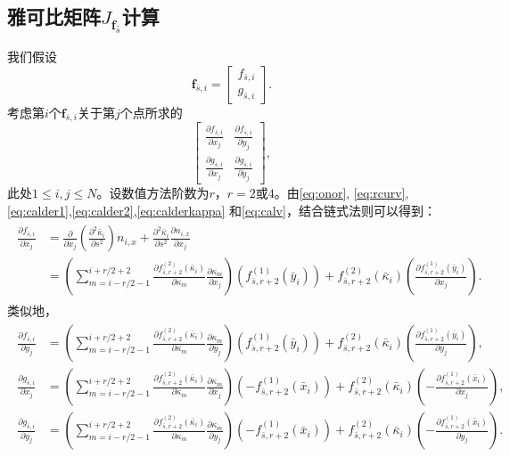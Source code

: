 \documentclass[a4paper,twoside]{ctexart}
\newcommand{\pdfrac}[2]{\frac{\partial #1}{\partial #2}}
\begin{document}
\subsection{雅可比矩阵$J_{\boldsymbol f_{\bar{s}}}$计算}
\label{calJacobi}
我们假设
\begin{equation}
  \boldsymbol f_{\bar{s},i} = \begin{bmatrix}
    f_{\bar{s},i}\\
    g_{\bar{s},i}

  \end{bmatrix}.
\end{equation}
考虑第$i$个$\boldsymbol f_{\bar{s},i}$关于第$j$个点所求的
\begin{equation}
  \label{eq:Jacobiij}
  \begin{bmatrix}
  \pdfrac{f_{\bar{s},i}}{x_j}& \pdfrac{f_{\bar{s},i}}{y_j} \\
  \pdfrac{g_{\bar{s},i}}{x_j}& \pdfrac{g_{\bar{s},i}}{y_j}
\end{bmatrix},
\end{equation}
此处$1 \le i,j \le N$。设数值方法阶数为$r$，$r = 2$或$4$。由\eqref{eq:onor},
\eqref{eq:rcurv},\eqref{eq:calder1},\eqref{eq:calder2},\eqref{eq:calderkappa}
和\eqref{eq:calv}，结合链式法则可以得到：
\begin{eqnarray}
  \label{eq:showcalJacobi}
  \begin{aligned}
    \pdfrac{f_{\bar{s},i}}{x_j} &= \frac{\partial }{\partial
      x_j}(\frac{\partial^2\bar{\kappa}_i}{\partial s^2})n_{i,x}+
    \frac{\partial^2\bar{\kappa}_i}{\partial
      s^2}\pdfrac{n_{i,x}}{x_j}\\
    &=(\sum_{m=i-r/2-1}^{i+r/2+2}\pdfrac{f_{\bar{s},r+2}^{(2)}(\bar{\kappa}_i)}{\kappa_m}\pdfrac{\kappa_m}{x_j})(f_{\bar{s},r+2}^{(1)}(\bar{y}_i))
    + f_{\bar{s},r+2}^{(2)}(\bar{\kappa}_i)(\pdfrac{f_{\bar{s},r+2}^{(1)}(\bar{y}_i)}{x_j}).
  \end{aligned}
\end{eqnarray}
类似地，
\begin{eqnarray}
  \label{eq:showcalintails}
  \begin{aligned}
    \pdfrac{f_{\bar{s},i}}{y_j} &=(\sum_{m=i-r/2-1}^{i+r/2+2}\pdfrac{f_{\bar{s},r+2}^{(2)}(\bar{\kappa}_i)}{\kappa_m}\pdfrac{\kappa_m}{y_j})(f_{\bar{s},r+2}^{(1)}(\bar{y}_i))
    +
    f_{\bar{s},r+2}^{(2)}(\bar{\kappa}_i)(\pdfrac{f_{\bar{s},r+2}^{(1)}(\bar{y}_i)}{y_j}),\\
    \pdfrac{g_{\bar{s},i}}{x_j} &=(\sum_{m=i-r/2-1}^{i+r/2+2}\pdfrac{f_{\bar{s},r+2}^{(2)}(\bar{\kappa}_i)}{\kappa_m}\pdfrac{\kappa_m}{x_j})(-f_{\bar{s},r+2}^{(1)}(\bar{x}_i))
    +
    f_{\bar{s},r+2}^{(2)}(\bar{\kappa}_i)(-\pdfrac{f_{\bar{s},r+2}^{(1)}(\bar{x}_i)}{x_j}),\\
    \pdfrac{g_{\bar{s},i}}{y_j} &=(\sum_{m=i-r/2-1}^{i+r/2+2}\pdfrac{f_{\bar{s},r+2}^{(2)}(\bar{\kappa}_i)}{\kappa_m}\pdfrac{\kappa_m}{y_j})(-f_{\bar{s},r+2}^{(1)}(\bar{x}_i))
    +
    f_{\bar{s},r+2}^{(2)}(\bar{\kappa}_i)(-\pdfrac{f_{\bar{s},r+2}^{(1)}(\bar{x}_i)}{y_j}).\\
  \end{aligned}
\end{eqnarray}
\end{document}
